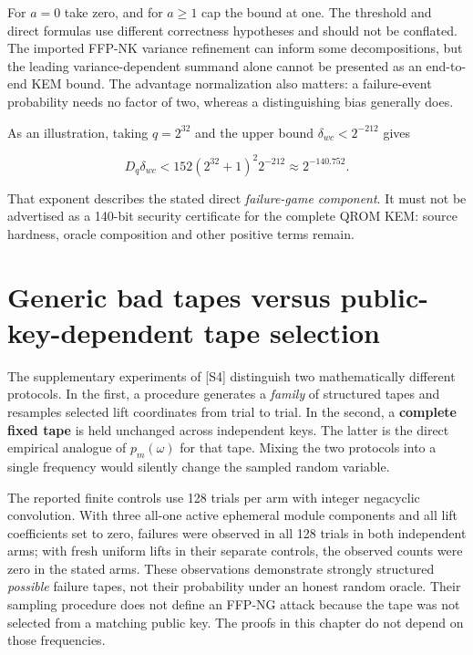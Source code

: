 \documentclass[
  11pt,
  a4paper,
  oneside]{report}
\begin{document}
For \(a=0\) take zero, and for \(a\ge1\) cap the bound at one. The
threshold and direct formulas use different correctness hypotheses and
should not be conflated. The imported FFP-NK variance refinement can
inform some decompositions, but the leading variance-dependent summand
alone cannot be presented as an end-to-end KEM bound. The advantage
normalization also matters: a failure-event probability needs no factor
of two, whereas a distinguishing bias generally does.

As an illustration, taking \(q=2^{32}\) and the upper bound
\(\delta_{wc}<2^{-212}\) gives

\[
D_q\delta_{wc}<152(2^{32}+1)^2 2^{-212}
\approx2^{-140.752}.
\]

That exponent describes the stated direct \emph{failure-game component}.
It must not be advertised as a 140-bit security certificate for the
complete QROM KEM: source hardness, oracle composition and other
positive terms remain.

\section{Generic bad tapes versus public-key-dependent tape
selection}\label{generic-bad-tapes-versus-public-key-dependent-tape-selection}

The supplementary experiments of {[}S4{]} distinguish two mathematically
different protocols. In the first, a procedure generates a \emph{family}
of structured tapes and resamples selected lift coordinates from trial
to trial. In the second, a \textbf{complete fixed tape} is held
unchanged across independent keys. The latter is the direct empirical
analogue of \(p_m(\omega)\) for that tape. Mixing the two protocols into
a single frequency would silently change the sampled random variable.

The reported finite controls use 128 trials per arm with integer
negacyclic convolution. With three all-one active ephemeral module
components and all lift coefficients set to zero, failures were observed
in all 128 trials in both independent arms; with fresh uniform lifts in
their separate controls, the observed counts were zero in the stated
arms. These observations demonstrate strongly structured \emph{possible}
failure tapes, not their probability under an honest random oracle.
Their sampling procedure does not define an FFP-NG attack because the
tape was not selected from a matching public key. The proofs in this
chapter do not depend on those frequencies.
\end{document}

